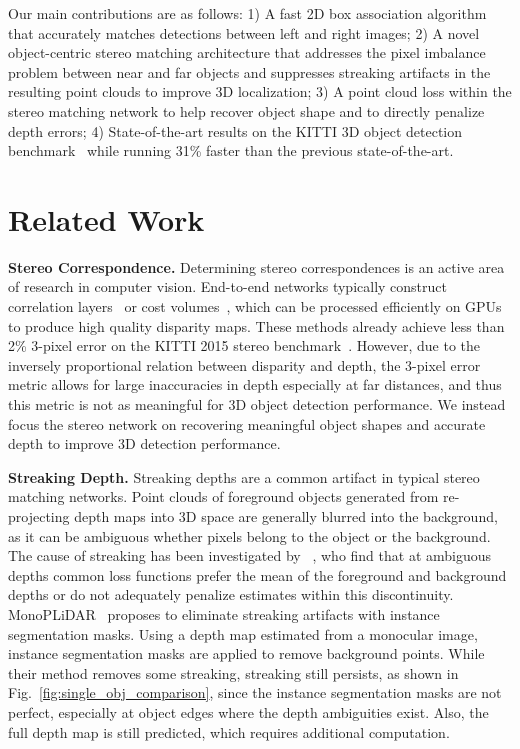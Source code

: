 \documentclass[letterpaper, 10 pt, conference]{ieeeconf}
\begin{document}
Our main contributions are as follows: 1) A fast 2D box association algorithm that accurately matches detections between left and right images; 2) A novel object-centric stereo matching architecture that addresses the pixel imbalance problem between near and far objects and suppresses streaking artifacts in the resulting point clouds to improve 3D localization; 3) A point cloud loss within the stereo matching network to help recover object shape and to directly penalize depth errors; 4) State-of-the-art results on the KITTI 3D object detection benchmark~\cite{geiger_kitti} while running 31\% faster than the previous state-of-the-art.



\section{Related Work}
\label{sec:related_works}

\textbf{Stereo Correspondence.} Determining stereo correspondences is an active area of research in computer vision. End-to-end networks typically construct correlation layers~\cite{mayer2016large} or cost volumes~\cite{chang2018psmnet, kendall2017end, yin2019hd3, zhang2019ganet}, which can be processed efficiently on GPUs to produce high quality disparity maps. These methods already achieve less than 2\% 3-pixel error on the KITTI 2015 stereo benchmark~\cite{kitti_stereo}. However, due to the inversely proportional relation between disparity and depth, the 3-pixel error metric allows for large inaccuracies in depth especially at far distances, and thus this metric is not as meaningful for 3D object detection performance. We instead focus the stereo network on recovering meaningful object shapes and accurate depth to improve 3D detection performance.

\textbf{Streaking Depth.} Streaking depths are a common artifact in typical stereo matching networks. Point clouds of foreground objects generated from re-projecting depth maps into 3D space are generally blurred into the background, as it can be ambiguous whether pixels belong to the object or the background. The cause of streaking has been investigated by ~\cite{imran_depth_coefficients}, who find that at ambiguous depths common loss functions prefer the mean of the foreground and background depths or do not adequately penalize estimates within this discontinuity. MonoPLiDAR~\cite{weng2019monocular} proposes to eliminate streaking artifacts with instance segmentation masks. Using a depth map estimated from a monocular image, instance segmentation masks are applied to remove background points. While their method removes some streaking, streaking still persists, as shown in Fig.~\ref{fig:single_obj_comparison}, since the instance segmentation masks are not perfect, especially at object edges where the depth ambiguities exist. Also, the full depth map is still predicted, which requires additional computation.
\end{document}
